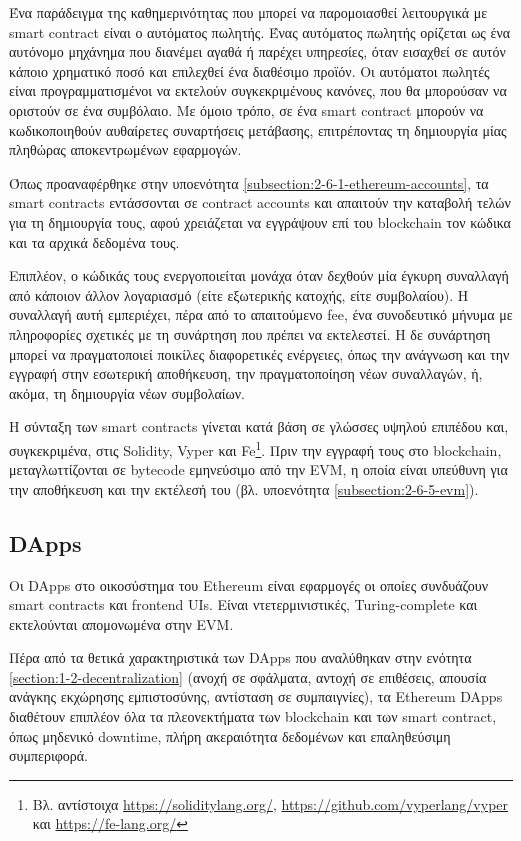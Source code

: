 Ένα παράδειγμα της καθημερινότητας που μπορεί να παρομοιασθεί λειτουργικά με smart contract είναι ο αυτόματος πωλητής\cite{2.6-ethereum-smart-contracts}. Ένας αυτόματος πωλητής ορίζεται ως ένα αυτόνομο μηχάνημα που διανέμει αγαθά ή παρέχει υπηρεσίες, όταν εισαχθεί σε αυτόν κάποιο χρηματικό ποσό και επιλεχθεί ένα διαθέσιμο προϊόν. Οι αυτόματοι πωλητές είναι προγραμματισμένοι να εκτελούν συγκεκριμένους κανόνες, που θα μπορούσαν να οριστούν σε ένα συμβόλαιο. Με όμοιο τρόπο, σε ένα smart contract μπορούν να κωδικοποιηθούν αυθαίρετες συναρτήσεις μετάβασης, επιτρέποντας τη δημιουργία μίας πληθώρας αποκεντρωμένων εφαρμογών.

Όπως προαναφέρθηκε στην υποενότητα \ref{subsection:2-6-1-ethereum-accounts}, τα smart contracts εντάσσονται σε contract accounts και απαιτούν την καταβολή τελών για τη δημιουργία τους, αφού χρειάζεται να εγγράψουν επί του blockchain τον κώδικα και τα αρχικά δεδομένα τους.

Επιπλέον, ο κώδικάς τους ενεργοποιείται μονάχα όταν δεχθούν μία έγκυρη συναλλαγή από κάποιον άλλον λογαριασμό (είτε εξωτερικής κατοχής, είτε συμβολαίου). Η συναλλαγή αυτή εμπεριέχει, πέρα από το απαιτούμενο fee, ένα συνοδευτικό μήνυμα με πληροφορίες σχετικές με τη συνάρτηση που πρέπει να εκτελεστεί. Η δε συνάρτηση μπορεί να πραγματοποιεί ποικίλες διαφορετικές ενέργειες, όπως την ανάγνωση και την εγγραφή στην εσωτερική αποθήκευση, την πραγματοποίηση νέων συναλλαγών, ή, ακόμα, τη δημιουργία νέων συμβολαίων.

Η σύνταξη των smart contracts γίνεται κατά βάση σε γλώσσες υψηλού επιπέδου και, συγκεκριμένα, στις Solidity, Vyper και Fe\footnote{Βλ. αντίστοιχα \url{https://soliditylang.org/}, \url{https://github.com/vyperlang/vyper} και \url{https://fe-lang.org/}}. Πριν την εγγραφή τους στο blockchain, μεταγλωττίζονται σε bytecode εμηνεύσιμο από την EVM, η οποία είναι υπεύθυνη για την αποθήκευση και την εκτέλεσή του (βλ. υποενότητα \ref{subsection:2-6-5-evm}).

\subsection{DApps}
Οι DApps στο οικοσύστημα του Ethereum είναι εφαρμογές οι οποίες συνδυάζουν \textenglish{smart contracts} και  \textenglish{frontend UIs}. Είναι ντετερμινιστικές, Turing-complete και εκτελούνται απομονωμένα στην EVM.\cite{2.6-ethereum-documentation}

Πέρα από τα θετικά χαρακτηριστικά των DApps που αναλύθηκαν στην ενότητα \ref{section:1-2-decentralization} (ανοχή σε σφάλματα, αντοχή σε επιθέσεις, απουσία ανάγκης εκχώρησης εμπιστοσύνης, αντίσταση σε συμπαιγνίες), τα Ethereum DApps διαθέτουν επιπλέον όλα τα πλεονεκτήματα των blockchain και των smart contract, όπως μηδενικό downtime, πλήρη ακεραιότητα δεδομένων και επαληθεύσιμη συμπεριφορά.

